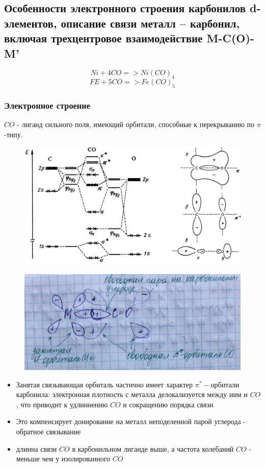 \subsection{Особенности электронного строения карбонилов d-элементов, описание связи металл – карбонил, включая трехцентровое взаимодействие M-C(O)-M’}							

$$Ni + 4 CO => Ni(CO)_4$$
$$FE + 5 CO => Fe(CO)_5$$


\subsubsection*{Электронное строение}

$CO$ -  лиганд сильного поля, имеющий орбитали, способные к перекрыванию по $\pi$-типу.

\begin{figure}[htp]
\centering
\includegraphics[scale=.800]{images/CO_orbs.png}
\caption{}
\label{}
\end{figure}


\begin{figure}[htp]
\centering
\includegraphics[scale=.800]{images/CO_structure.png}
\caption{}
\label{}
\end{figure}

\begin{itemize}
\item Занятая связывающая орбиталь частично имеет характер $\pi^*-$орбитали карбонила: электронная плотность с металла делокализуется между ним и $CO$, что приводит к удлиннению $CO$ и сокращению порядка связи
\item Это компенсирует донирование на металл неподеленной парой углерода - обратное связывание
\item длинна связи $CO$ в карбонильном лиганде выше, а частота колебаний $CO$ - меньше чем у изолированного $CO$
\end{itemize}

